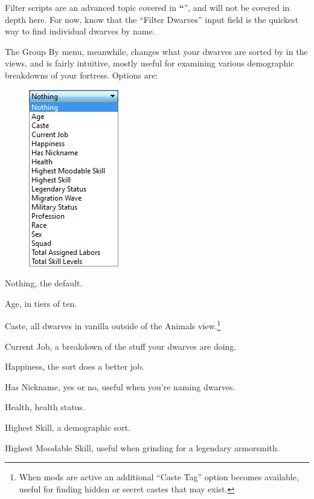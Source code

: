 \documentclass[]{article}
\newcommand{\jump}[1] {\textbf{``\nameref{sec:#1}}''}
\begin{document}
Filter scripts are an advanced topic covered in \jump{Filter Scripts}, and will not
be covered in depth here. For now, know that the ``Filter Dwarves'' input field is the quickest way to find individual dwarves by name.

The Group By menu, meanwhile, changes what your dwarves are sorted by in the views, and is fairly
intuitive, mostly useful for examining various demographic breakdowns of your fortress. Options are:
\vspace{12pt}

\begin{figure}
\begin{center}
\vspace{-10pt}
\includegraphics[scale=.85]{Sec1Fig11+.png}
\vspace{-20pt}
\end{center}
\end{figure}
\noindent Nothing, the default.

\noindent Age, in tiers of ten.

\noindent Caste, all dwarves in vanilla outside of the Animals view.\footnote{When mods are active an
additional ``Caste Tag'' option becomes available, useful for finding hidden or secret castes that may
exist.}

\noindent Current Job, a breakdown of the stuff your dwarves are doing.

\noindent Happiness, the sort does a better job.

\noindent Has Nickname, yes or no, useful when you're naming dwarves.

\noindent Health, health status.

\noindent Highest Skill, a demographic sort.

\noindent Highest Moodable Skill, useful when grinding for a legendary armorsmith.
\end{document}
